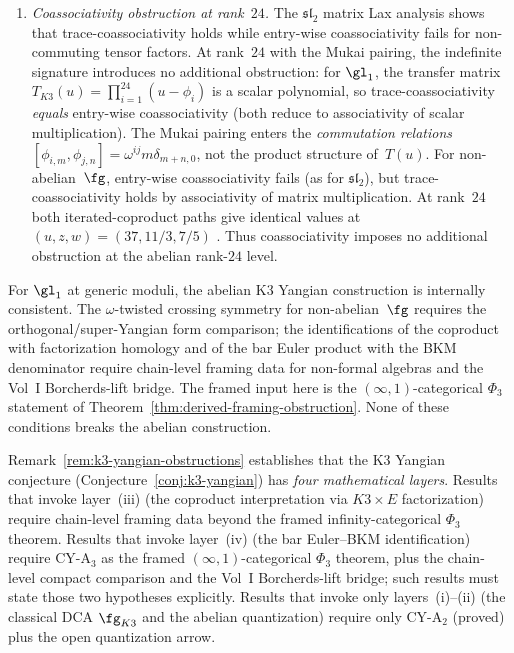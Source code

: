 \begin{remark}
\begin{enumerate}[label=\textbf{A\arabic*.}, leftmargin=2.5em]
\item \emph{Coassociativity obstruction at rank~$24$.}
The $\mathfrak{sl}_2$ matrix Lax analysis shows that trace-coassociativity holds while entry-wise coassociativity
fails for non-commuting tensor factors. At rank~$24$ with the
Mukai pairing, the indefinite signature introduces no additional
obstruction: for $\gl_1$, the transfer matrix
$T_{K3}(u) = \prod_{i=1}^{24}(u - \phi_i)$ is a scalar polynomial,
so trace-coassociativity \emph{equals} entry-wise coassociativity
(both reduce to associativity of scalar multiplication).
The Mukai pairing enters the \emph{commutation relations}
$[\phi_{i,m}, \phi_{j,n}] = \omega^{ij} m \delta_{m+n,0}$,
not the product structure of~$T(u)$.
For non-abelian~$\fg$, entry-wise coassociativity fails (as for
$\mathfrak{sl}_2$), but trace-coassociativity holds by associativity
of matrix multiplication.
At rank~$24$ both iterated-coproduct paths give identical values at
$(u, z, w) = (37, 11/3, 7/5)$
.
Thus coassociativity imposes no additional obstruction at the abelian
rank-$24$ level.
\end{enumerate}
For $\gl_1$ at generic moduli, the abelian K3 Yangian construction is
internally consistent. The $\omega$-twisted crossing symmetry for
non-abelian~$\fg$ requires the orthogonal/super-Yangian form
comparison; the identifications of the coproduct with factorization
homology and of the bar Euler product with the BKM denominator require
chain-level framing data for non-formal algebras and the Vol~I
Borcherds-lift bridge. The framed input here is the
\((\infty,1)\)-categorical $\Phi_3$ statement of
Theorem~\ref{thm:derived-framing-obstruction}. None of these conditions
breaks the abelian construction.
\end{remark}

\begin{remark}
\label{rem:k3-yangian-scoping}
Remark~\ref{rem:k3-yangian-obstructions} establishes
that the K3 Yangian conjecture (Conjecture~\ref{conj:k3-yangian}) has
\emph{four mathematical layers}. Results that invoke
layer~(iii) (the coproduct interpretation via $K3 \times E$
factorization) require chain-level framing data beyond the
framed infinity-categorical $\Phi_3$ theorem. Results that invoke
layer~(iv) (the bar Euler--BKM identification) require CY-A$_3$
as the framed $(\infty,1)$-categorical $\Phi_3$ theorem, plus the
chain-level compact comparison and the Vol~I Borcherds-lift bridge;
such results must state those two hypotheses explicitly.
Results that invoke only layers~(i)--(ii) (the classical DCA $\fg_{K3}$
and the abelian quantization) require only CY-A$_2$ (proved) plus
the open quantization arrow.
\end{remark}


